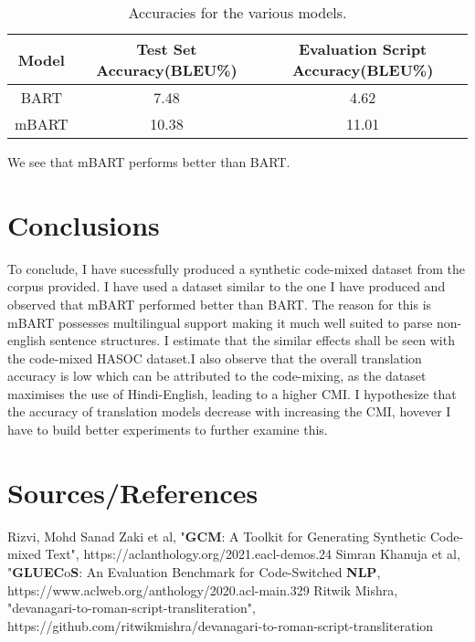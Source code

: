 \documentclass{article}
\begin{document}
\begin{table}[h]
\centering
\begin{tabular}{c|c|c}
Model & Test Set Accuracy(BLEU\%) & Evaluation Script Accuracy(BLEU\%) \\\hline

BART &  7.48 & 4.62\\
mBART & 10.38 & 11.01
\end{tabular}
\caption{\label{tab:widgets}Accuracies for the various models.}
\end{table}
\noindent

We see that mBART performs better than BART.
\newpage
\section{Conclusions}
To conclude, I have sucessfully produced a synthetic code-mixed dataset from the corpus provided. I have used a dataset similar to the one I have produced  and observed that mBART performed better than BART. The reason for this is mBART possesses multilingual support making it much well suited to parse non-english sentence structures.
\newline\newline
I estimate that the similar effects shall be seen with the code-mixed HASOC dataset.I also observe that the overall translation accuracy is low which can be attributed to the code-mixing, as the dataset maximises the use of Hindi-English, leading to a higher CMI. I hypothesize that the accuracy of translation models decrease with increasing the CMI, hovever I have to build better experiments to further examine this.


\section{Sources/References}
Rizvi, Mohd Sanad Zaki et al, "\textbf{GCM}: A Toolkit for Generating Synthetic Code-mixed Text", https://aclanthology.org/2021.eacl-demos.24
\newline\newline
Simran Khanuja et al, "\textbf{GLUEC}o\textbf{S}: An Evaluation Benchmark for Code-Switched \textbf{NLP}, \newline https://www.aclweb.org/anthology/2020.acl-main.329
\newline\newline
Ritwik Mishra, "devanagari-to-roman-script-transliteration", https://github.com/ritwikmishra/devanagari-to-roman-script-transliteration
\newline\newline
\end{document}
